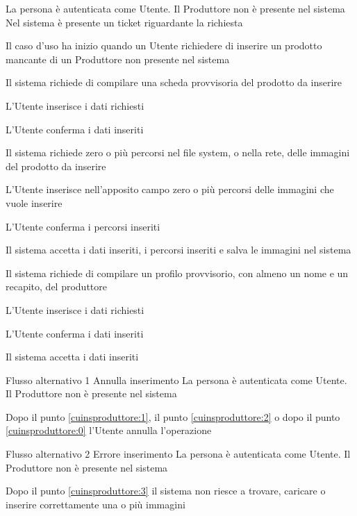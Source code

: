 {}
{La persona è autenticata come Utente. Il Produttore non è presente nel sistema}
{Nel sistema è presente un ticket riguardante la richiesta}
{\begin{enumCU}
		\item Il caso d'uso ha inizio quando un Utente richiedere di inserire un prodotto mancante di un Produttore non presente nel sistema
		\item Il sistema richiede di compilare una scheda provvisoria del prodotto da inserire
		\item L'Utente inserisce i dati richiesti \label{cuinsproduttore:1}
		\item L'Utente conferma i dati inseriti 
		\item Il sistema richiede zero o più percorsi nel file system, o nella rete, delle immagini del prodotto da inserire
		\item L'Utente inserisce nell'apposito campo zero o più percorsi delle immagini che vuole inserire \label{cuinsproduttore:2}
		\item L'Utente conferma i percorsi inseriti \label{cuinsproduttore:3}
		\item Il sistema accetta i dati inseriti, i percorsi inseriti e salva le immagini nel sistema
		\item Il sistema richiede di compilare un profilo provvisorio, con almeno un nome e un recapito, del produttore
		\item L'Utente inserisce i dati richiesti \label{cuinsproduttore:0}
		\item L'Utente conferma i dati inseriti
		\item Il sistema accetta i dati inseriti
	\end{enumCU}}
%
{Flusso alternativo 1}%
{Annulla inserimento}%
{La persona è autenticata come Utente. Il Produttore non è presente nel sistema}%
{\postNulle}%
{\begin{enumCU}
		\item Dopo il punto \ref{cuinsproduttore:1}, il punto \ref{cuinsproduttore:2} o dopo il punto \ref{cuinsproduttore:0} l'Utente annulla l'operazione
	\end{enumCU}}%
%
{Flusso alternativo 2}%
{Errore inserimento}%
{La persona è autenticata come Utente. Il Produttore non è presente nel sistema}%
{\postNulle}%
{\begin{enumCU}
		\item Dopo il punto \ref{cuinsproduttore:3} il sistema non riesce a trovare, caricare o inserire correttamente una o più immagini
	\end{enumCU}}%



